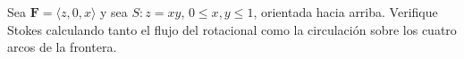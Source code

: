 ﻿Sea $\mathbf F=\langle z,0,x\rangle$ y sea $S:z=xy$, $0\leq x,y\leq1$, orientada hacia arriba. Verifique Stokes calculando tanto el flujo del rotacional como la circulación sobre los cuatro arcos de la frontera.
